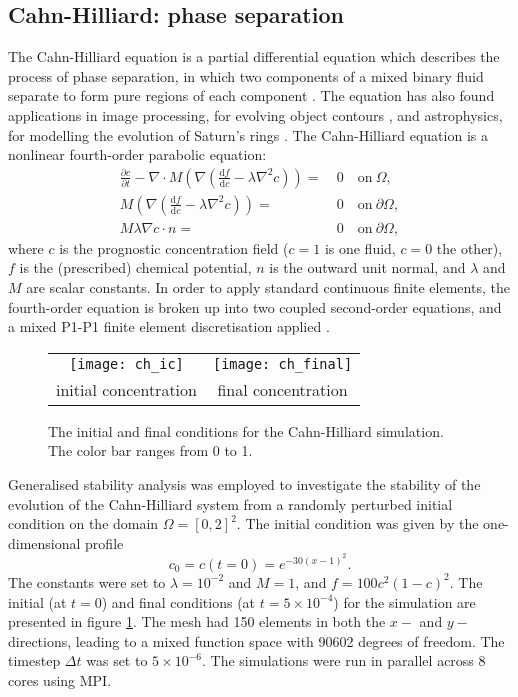 \documentclass{siamltex}
\begin{document}
\subsection{Cahn-Hilliard: phase separation}
The Cahn-Hilliard equation is a partial differential equation which describes the process of phase separation, in which
two components of a mixed binary fluid separate to form pure regions of each component \cite{cahn1958}. The equation
has also found applications in image processing, for evolving object contours \cite{capuzzo2002}, and astrophysics,
for modelling the evolution of Saturn's rings \cite{tremaine2003}. The Cahn-Hilliard equation is a nonlinear fourth-order
parabolic equation:
\begin{align}
\frac{\partial c}{\partial t} - \nabla \cdot M \left( \nabla \left( \frac{\mathrm{d}f}{\mathrm{d}c}
- \lambda \nabla^2 c\right) \right) =& \ 0 \quad \mathrm{on}\ \Omega, \\
M \left( \nabla \left( \frac{\mathrm{d}f}{\mathrm{d}c} - \lambda \nabla^2 c\right) \right) =& \ 0 \quad \mathrm{on}\ \partial \Omega, \\
M \lambda \nabla c \cdot n =& \ 0 \quad \mathrm{on}\ \partial \Omega,
\end{align}
where $c$ is the prognostic concentration field ($c=1$ is one fluid, $c=0$ the other), $f$ is the (prescribed) chemical potential, $n$ is the outward unit normal, and
$\lambda$ and $M$ are scalar constants. In order to apply standard continuous finite elements, the fourth-order equation is broken up
into two coupled second-order equations, and a mixed P1-P1 finite element discretisation applied \cite{wells2006}.

\begin{figure}
  \centering
  \begin{tabular}{cc}
    \texttt{[image: ch\_ic]} & \texttt{[image: ch\_final]}
    \\
    initial concentration & final concentration
  \end{tabular}
  \caption{The initial and final conditions for the Cahn-Hilliard simulation. The color bar ranges from 0 to 1.}
  \label{fig:ch_conditions}
\end{figure}

Generalised stability analysis was employed to investigate the stability of the evolution of the Cahn-Hilliard system from a
randomly perturbed initial condition on the domain $\Omega = \left[0, 2\right]^2$. The initial condition was given by the one-dimensional profile
\begin{equation}
c_0 = c(t=0) = e^{-30 (x - 1)^2}.
\end{equation}
The constants were set to $\lambda = 10^{-2}$ and $M = 1$, and $f = 100c^2(1-c)^2$. The initial (at $t=0$) and final
conditions (at $t=5\times10^{-4}$) for the simulation are presented in figure \ref{fig:ch_conditions}. The mesh had 150 elements in both
the $x-$ and $y-$ directions, leading to a mixed function space with 90602 degrees of freedom. The timestep $\Delta t$ was set to
$5\times10^{-6}$. The simulations were run in parallel across 8 cores using MPI.
\end{document}
